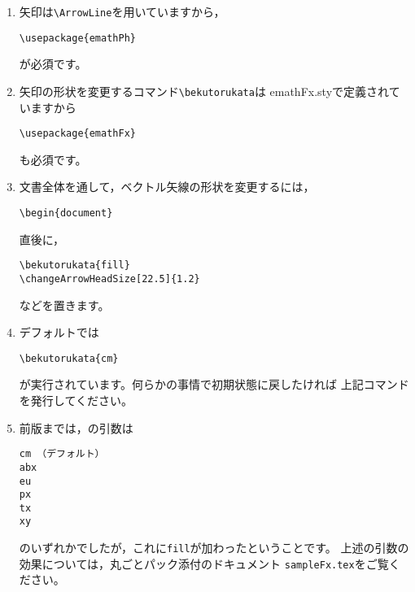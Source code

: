 \documentclass[a4j]{jarticle}
\begin{document}
\begin{enumerate}[注 1.~]
  \item 矢印は\verb+\ArrowLine+を用いていますから，
\begin{jquote}
\begin{verbatim}
\usepackage{emathPh}
\end{verbatim}
\end{jquote}
    が必須です。
  \item 矢印の形状を変更するコマンド\verb+\bekutorukata+は
    \textsf{emathFx.sty}で定義されていますから
\begin{jquote}
\begin{verbatim}
\usepackage{emathFx}
\end{verbatim}
\end{jquote}
    も必須です。
  \item 文書全体を通して，ベクトル矢線の形状を変更するには，
\begin{jquote}
\begin{verbatim}
\begin{document}
\end{verbatim}
\end{jquote}
直後に，
\begin{jquote}
\begin{verbatim}
\bekutorukata{fill}
\changeArrowHeadSize[22.5]{1.2}
\end{verbatim}
\end{jquote}
    などを置きます。    
  \item デフォルトでは
\begin{jquote}
\begin{verbatim}
\bekutorukata{cm}
\end{verbatim}
\end{jquote}
    が実行されています。何らかの事情で初期状態に戻したければ
    上記コマンドを発行してください。
  \item 前版までは，の引数は
\begin{jquote}
\begin{verbatim}
cm （デフォルト）
abx
eu
px
tx
xy
\end{verbatim}
\end{jquote}
    のいずれかでしたが，これに\verb+fill+が加わったということです。
    上述の引数の効果については，丸ごとパック添付のドキュメント
    \texttt{sampleFx.tex}をご覧ください。
\end{enumerate}
\end{document}
